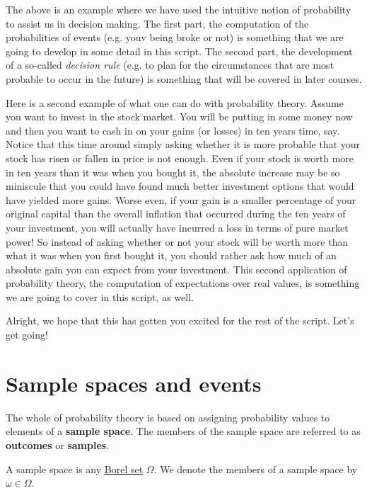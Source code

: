 \documentclass[a4paper,11pt,leqno]{report}
\begin{document}
The above is an example where we have used the intuitive notion of probability to assist us in decision
making. The first part, the computation of the probabilities of events (e.g. youv being broke or not)
is something that we are going to develop in some detail in this script. The second part, the development
of a so-called \textit{decision rule} (e.g. to plan for the circumstances that are most probable to 
occur in the future) is something that will be covered in later courses.

Here is a second example of what one can do with probability theory. Assume you want to invest in the 
stock market. You will be putting in some money now and then you want to cash in on your gains (or losses)
in ten years time, say. Notice that this time around simply asking whether it is more probable that your
stock has risen or fallen in price is not enough. Even if your stock is worth more in ten years than it
was when you bought it, the absolute increase may be so miniscule that you could have found much better
investment options that would have yielded more gains. Worse even, if your gain is a smaller percentage
of your original capital than the overall inflation that occurred during the ten years of your investment,
you will actually have incurred a loss in terms of pure market power! So instead of asking whether
or not your stock will be worth more than what it was when you first bought it, you should rather
ask how much of an absolute gain you can expect from your investment. This second application of probability
theory, the computation of expectations over real values, is something we are going to cover in this
script, as well.

Alright, we hope that this has gotten you excited for the rest of the script. Let's get going!

\section{Sample spaces and events}
The whole of probability theory is based on assigning probability values to elements of a 
\textbf{sample space}. The members of the sample space are referred to as \textbf{outcomes} or \textbf{samples}.

\begin{Definition} A sample space is any \href{http://en.wikipedia.org/wiki/Borel_set}{Borel set} 
$ \Omega $. We denote the members of a sample space by $ \omega \in \Omega $.
\end{Definition}
\end{document}
